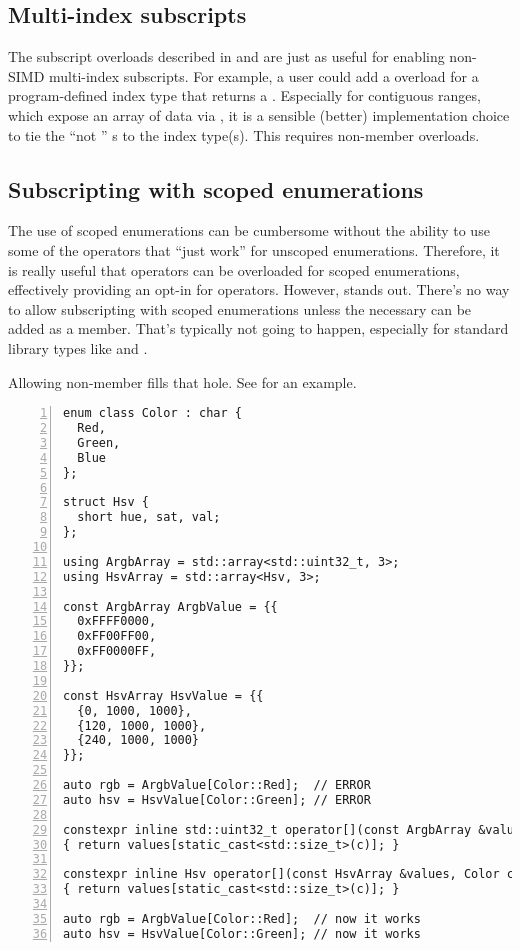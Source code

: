 
\subsection{Multi-index subscripts}
The subscript overloads described in  and  are just as useful for enabling non-SIMD multi-index subscripts.
For example, a user could add a  overload for a program-defined index type that returns a .
Especially for contiguous ranges, which expose an array of data via , it is a sensible (better) implementation choice to tie the “not ” s to the index type(s).
This requires non-member  overloads.

\subsection{Subscripting with scoped enumerations}
The use of scoped enumerations can be cumbersome without the ability to use some of the operators that “just work” for unscoped enumerations.
Therefore, it is really useful that operators can be overloaded for scoped enumerations, effectively providing an opt-in for operators.
However,  stands out.
There's no way to allow subscripting with scoped enumerations unless the necessary  can be added as a member.
That's typically not going to happen, especially for standard library types like  and .

Allowing non-member  fills that hole.
See  for an example.
\begin{lstlisting}[numbers=left,float={hbtp},label=lst:colorsubscripts,caption={
  Scoped enumerations sometimes should be able to opt-in to being used as subscript index
}]
enum class Color : char {
  Red,
  Green,
  Blue
};

struct Hsv {
  short hue, sat, val;
};

using ArgbArray = std::array<std::uint32_t, 3>;
using HsvArray = std::array<Hsv, 3>;

const ArgbArray ArgbValue = {{
  0xFFFF0000,
  0xFF00FF00,
  0xFF0000FF,
}};

const HsvArray HsvValue = {{
  {0, 1000, 1000},
  {120, 1000, 1000},
  {240, 1000, 1000}
}};

auto rgb = ArgbValue[Color::Red];  // ERROR
auto hsv = HsvValue[Color::Green]; // ERROR

constexpr inline std::uint32_t operator[](const ArgbArray &values, Color c)
{ return values[static_cast<std::size_t>(c)]; }

constexpr inline Hsv operator[](const HsvArray &values, Color c)
{ return values[static_cast<std::size_t>(c)]; }

auto rgb = ArgbValue[Color::Red];  // now it works
auto hsv = HsvValue[Color::Green]; // now it works
\end{lstlisting}

